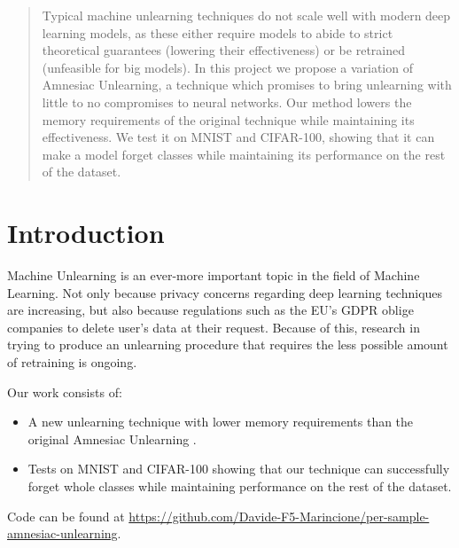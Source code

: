\documentclass{article}
\begin{document}

\printAffiliationsAndNotice{}

\begin{abstract}
Typical machine unlearning techniques do not scale well with modern deep learning models, as these either require models to abide to strict theoretical guarantees (lowering their effectiveness) or be retrained (unfeasible for big models). In this project we propose a variation of Amnesiac Unlearning, a technique which promises to bring unlearning with little to no compromises to neural networks. Our method lowers the memory requirements of the original technique while maintaining its effectiveness. We test it on MNIST and CIFAR-100, showing that it can make a model forget classes while maintaining its performance on the rest of the dataset.
\end{abstract}
\section{Introduction}
Machine Unlearning is an ever-more important topic in the field of Machine Learning. Not only because privacy concerns regarding deep learning techniques are increasing, but also because regulations such as the EU's GDPR oblige companies to delete user's data at their request. Because of this, research in trying to produce an unlearning procedure that requires the less possible amount of retraining is ongoing.

Our work consists of:
\begin{itemize}
    \item A new unlearning technique with lower memory requirements than the original Amnesiac Unlearning \cite{graves2021amnesiac}.
    \item Tests on MNIST and CIFAR-100 showing that our technique can successfully forget whole classes while maintaining performance on the rest of the dataset.
\end{itemize}
Code can be found at \url{https://github.com/Davide-F5-Marincione/per-sample-amnesiac-unlearning}.
\end{document}
